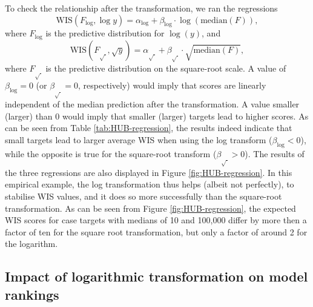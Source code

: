 \documentclass{article}
\begin{document}
To check the relationship after the transformation, we ran the regressions
\begin{equation}
    \text{WIS}(F_{\log}, \log y) = \alpha_{\log} + \beta_{\log} \cdot \log{(\text{median}(F))},
\end{equation}
where $F_{\log}$ is the predictive distribution for $\log(y)$, and
\begin{equation}
    \text{WIS}(F_{\sqrt{\ }}, \sqrt{y}) = \alpha_{\sqrt{\ }} + \beta_{\sqrt{\ }} \cdot \sqrt{\text{median}(F)},
\end{equation} 
where $F_{\sqrt{\ }}$ is the predictive distribution on the square-root scale. A value of $\beta_{\log} = 0$ (or $\beta_{\sqrt{\ }} = 0$, respectively) would imply that scores are linearly independent of the median prediction after the transformation. A value smaller (larger) than 0 would imply that smaller (larger) targets lead to higher scores. As can be seen from Table \ref{tab:HUB-regression}, the results indeed indicate that small targets lead to larger average WIS when using the log transform ($\beta_{\log} < 0$), while the opposite is true for the square-root transform ($\beta_{\sqrt{\ }} > 0$). The results of the three regressions are also displayed in Figure \ref{fig:HUB-regression}. In this empirical example, the log transformation thus helps (albeit not perfectly), to stabilise WIS values, and it does so more successfully than the square-root transformation. As can be seen from Figure \ref{fig:HUB-regression}, the expected WIS scores for case targets with medians of 10 and 100,000 differ by more then a factor of ten for the square root transformation, but only a factor of around 2 for the logarithm.

\subsection{Impact of logarithmic transformation on model rankings}
\end{document}
